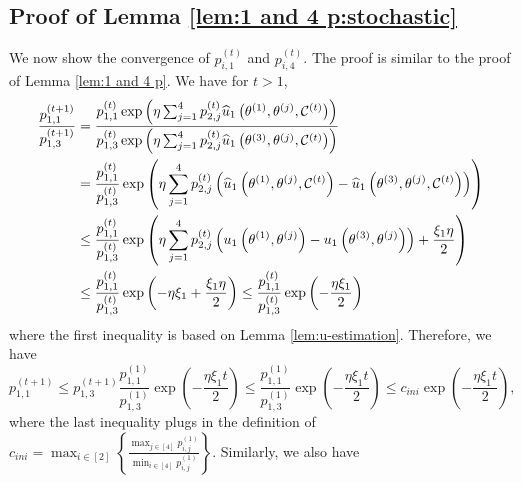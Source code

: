 \subsection{Proof of Lemma \ref{lem:1 and 4 p:stochastic}} 
\label{proof:Theoerm:stoc}
We now show the convergence of $p_{i,1}^{(t)}$ and $p_{i,4}^{(t)}$. The proof is similar to the proof of Lemma \ref{lem:1 and 4 p}. We have for $t>1$,
\begin{equation*}
\begin{split}
    \frac{p^{(t+1)}_{1,1}}{p^{(t+1)}_{1,3}}  = {} & \frac{p^{(t)}_{1,1}\exp\left(\eta \sum_{j=1}^4 p_{2,j}^{(t)}\widehat{u}_1\left(\theta^{(1)},\theta^{(j)},\mathcal{C}^{(t)}\right) \right)}{p^{(t)}_{1,3}\exp\left(\eta \sum_{j=1}^4 p_{2,j}^{(t)}\widehat{u}_1\left(\theta^{(3)},\theta^{(j)},\mathcal{C}^{(t)}\right) \right)}\\
    = {} & \frac{p^{(t)}_{1,1}}{p_{1,3}^{(t)}}\exp\left(\eta \sum_{j=1}^4 p_{2,j}^{(t)}\left(\widehat{u}_1\left(\theta^{(1)},\theta^{(j)},\mathcal{C}^{(t)}\right) - \widehat{u}_1\left(\theta^{(3)},\theta^{(j)},\mathcal{C}^{(t)}\right)\right) \right)\\
    \leq {} & \frac{p^{(t)}_{1,1}}{p_{1,3}^{(t)}}\exp\left(\eta \sum_{j=1}^4 p_{2,j}^{(t)}\left({u}_1\left(\theta^{(1)},\theta^{(j)}\right) - {u}_1\left(\theta^{(3)},\theta^{(j)}\right)\right) + \frac{\xi_1\eta}{2}\right)\\
    \leq {} & \frac{p^{(t)}_{1,1}}{p_{1,3}^{(t)}}\exp\left( -\eta\xi_1 +\frac{\xi_1\eta}{2} \right)\leq  \frac{p^{(t)}_{1,1}}{p_{1,3}^{(t)}}\exp\left( -\frac{\eta\xi_1}{2} \right)
\end{split}
\end{equation*}
where the first inequality is based on Lemma  \ref{lem:u-estimation}. Therefore, we have 
\[
{p^{(t+1)}_{1,1}}\leq p_{1,3}^{(t+1)} \frac{p^{(1)}_{1,1}}{p^{(1)}_{1,3}}\exp\left(-\frac{\eta\xi_1t}{2}\right)\leq  \frac{p^{(1)}_{1,1}}{p^{(1)}_{1,3}}\exp\left(-\frac{\eta\xi_1t}{2}\right)\leq c_{ini}\exp\left(-\frac{\eta\xi_1t}{2}\right),
\]
where the last inequality plugs in the definition of $c_{ini}=\max_{i\in[2]}\left\{\frac{\max_{j\in[4]}p^{(1)}_{i,j}}{\min_{i\in[4]}p^{(1)}_{i,j}}\right\}$.
Similarly, we also have 

